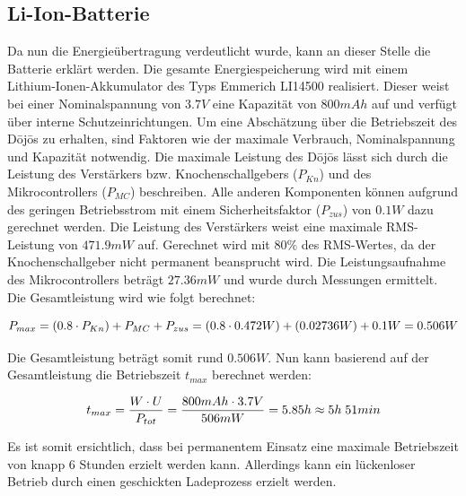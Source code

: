 \subsection{Li-Ion-Batterie}\label{sec:energiespeicher}
Da nun die Energieübertragung verdeutlicht wurde, kann an dieser Stelle die Batterie erklärt werden. Die gesamte Energiespeicherung wird mit einem Lithium-Ionen-Akkumulator des Typs Emmerich LI14500 realisiert. Dieser weist bei einer Nominalspannung von $3.7V$ eine Kapazität von $800mAh$ auf und verfügt über interne Schutzeinrichtungen. Um eine Abschätzung über die Betriebszeit des Dōjōs zu erhalten, sind Faktoren wie der maximale Verbrauch, Nominalspannung und Kapazität notwendig. Die maximale Leistung des Dōjōs lässt sich durch die Leistung des Verstärkers bzw. Knochenschallgebers ($P_{Kn}$) und des Mikrocontrollers ($P_{MC}$) beschreiben. Alle anderen Komponenten können aufgrund des geringen Betriebsstrom mit einem Sicherheitsfaktor ($P_{zus}$) von $0.1W$ dazu gerechnet werden. Die Leistung des Verstärkers weist eine maximale RMS-Leistung von $471.9mW$ auf. Gerechnet wird mit $80\%$ des RMS-Wertes, da der Knochenschallgeber nicht permanent beansprucht wird. Die Leistungsaufnahme des Mikrocontrollers beträgt $27.36mW$ und wurde durch Messungen ermittelt. Die Gesamtleistung wird wie folgt berechnet:

\begin{equation}
\centering
P_{max}=\left(0.8\cdot P_{Kn}\right)+P_{MC}+P_{zus}=(0.8\cdot 0.472W)+(0.02736W)+0.1W=0.506W
\label{eq:MaxLeistung}
\end{equation}

Die Gesamtleistung beträgt somit rund $0.506 W$. Nun kann basierend auf der Gesamtleistung die Betriebszeit $t_{max}$ berechnet werden:

\begin{equation}
\centering
t_{max}=\frac{W\cdot U}{P_{tot}}=\frac{800mAh \cdot 3.7V}{506mW}=5.85h\approx 5h \thickspace 51min
\label{eq:Betriebszeit}
\end{equation}

Es ist somit ersichtlich, dass bei permanentem Einsatz eine maximale Betriebszeit von knapp 6 Stunden erzielt werden kann. Allerdings kann ein lückenloser Betrieb durch einen geschickten Ladeprozess erzielt werden.

